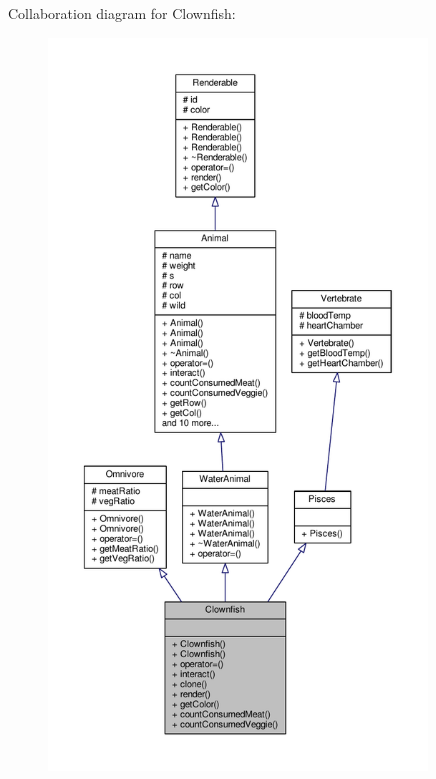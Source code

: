 Collaboration diagram for Clownfish\+:
\nopagebreak
\begin{figure}[H]
\begin{center}
\leavevmode
\includegraphics[height=550pt]{classClownfish__coll__graph}
\end{center}
\end{figure}
